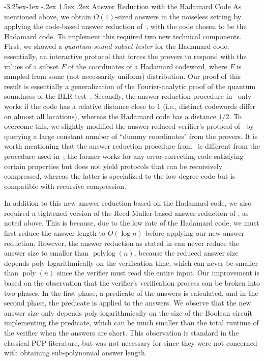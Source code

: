 \documentclass[10pt,a4paper]{article}
\makeatletter
\renewcommand{\subsubsection}{\@startsection{subsubsection}{2}{\z@}%
             {-3.25ex\@plus -1ex \@minus -.2ex}%
             {1.5ex \@plus .2ex}%
             {\normalfont\normalsize\scshape\bfseries}}
\theoremstyle{plain}
\theoremstyle{definition}
\newcommand{\poly} {\ensuremath{\operatorname{poly}}}
\newcommand{\polylog} {\ensuremath{\operatorname{polylog}}}
\newcommand{\1}{\mathbb{1}} %
\makeatother
\begin{document}
\subsubsection{Answer Reduction with the Hadamard Code} 
As mentioned above, we obtain $O(1)$-sized answers in the noiseless setting by applying the code-based answer reduction of~\cite{neexp}, with the code chosen to be the Hadamard code. To implement this required two new technical components. First, we showed a \emph{quantum-sound subset tester} for the Hadamard code: essentially, an interactive protocol that forces the provers to respond with the values of a subset $F$ of the coordinates of a Hadamard codeword, where $F$ is sampled from some (not necessarily uniform) distribution. Our proof of this result is essentially a generalization of the Fourier-analytic proof of the quantum soundness of the BLR test~\cite{BLR,NV17}. Secondly, the answer reduction procedure in~\cite{neexp} only works if the code has a relative distance close to $1$ (i.e., distinct codewords differ on almost all locations), whereas the Hadamard code has a distance $1/2$. 
To overcome this, we slightly modified the answer-reduced verifier's protocol of~\cite{neexp} by querying a large constant number of ``dummy coordinates" from the provers. It is worth mentioning that the answer reduction procedure from~\cite{neexp} is different from the procedure used in~\cite{JNVWY'20}; the former works for any error-correcting code satisfying certain properties but does not yield protocols that can be recursively compressed, whereas the latter is specialized to the low-degree code but is compatible with recursive compression. 


In addition to this new answer reduction based on the Hadamard code, we also required a tightened version of the Reed-Muller-based answer reduction of \cite{JNVWY'20}, as noted above. This is because, due to the low rate of the Hadamard code, we must first reduce the answer length to $O(\log n)$ before applying our new answer reduction. However, the answer reduction as stated in \cite{JNVWY'20} can never reduce the answer size to smaller than $\polylog(n)$, because the reduced answer size depends poly-logarithmically on the verification time, which can never be smaller than $\poly(n)$ since the verifier must read the entire input. Our improvement is based on the observation that the verifier's verification process can be broken into two phases. In the first phase, a predicate of the answers is calculated, and in the second phase, the predicate is applied to the answers. We observe that the new answer size only depends poly-logarithmically on the size of the Boolean circuit implementing the predicate, which can be much smaller than the total runtime of the verifier when the answers are short. This observation is standard in the classical PCP literature, but was not necessary for \cite{JNVWY'20} since they were not concerned with obtaining sub-polynomial answer length.
\end{document}
